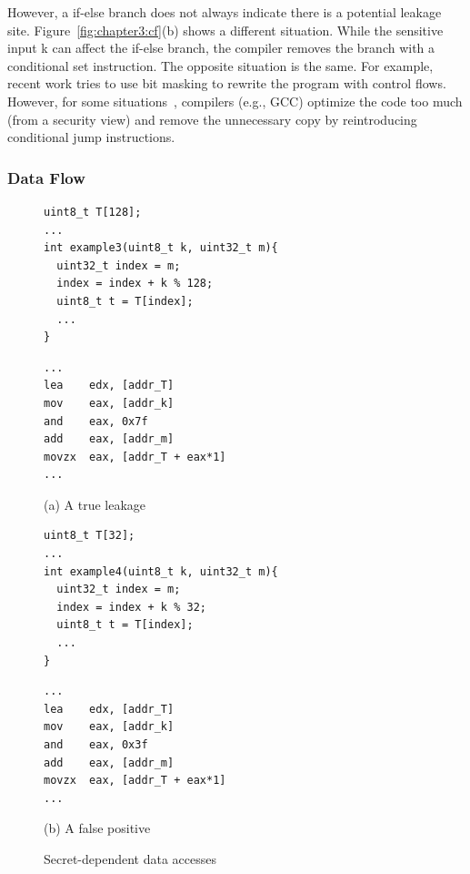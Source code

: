 However, a if-else branch does not always indicate there is a potential leakage site. Figure~\ref{fig:chapter3:cf}(b) shows a different situation. While the sensitive input \textsf{k} can affect the if-else branch, the compiler removes the branch with a conditional set instruction.  The opposite situation is the same. For example, recent work tries to use bit masking to rewrite the program with control flows. However, for some situations~\cite{Coppens:2009:PMT:1607723.1608124}, compilers (e.g., GCC) optimize the code too much (from a security view) and remove the unnecessary copy by reintroducing conditional jump instructions.
\subsubsection{Data Flow}
\begin{figure}[ht]
  \begin{minipage}{0.4\linewidth}
    \begin{lstlisting}[xleftmargin=.15\textwidth, xrightmargin=.0\textwidth, frame=none]
uint8_t T[128];
...
int example3(uint8_t k, uint32_t m){
  uint32_t index = m;
  index = index + k % 128;
  uint8_t t = T[index];
  ...
}
\end{lstlisting}
  \end{minipage}
  \hfill
  \begin{minipage}{0.4\linewidth}
    \begin{lstlisting}[xleftmargin=.15\textwidth, xrightmargin=.00\textwidth, frame=none, numbers=none, mathescape=true]
...
lea    edx, [addr_T]
mov    eax, [addr_k]
and    eax, 0x7f
add    eax, [addr_m]
movzx  eax, [addr_T + eax*1]
...
\end{lstlisting}
  \end{minipage}\caption*{(a) A true leakage}

  \begin{minipage}{0.4\linewidth}
    \begin{lstlisting}[xleftmargin=.15\textwidth, xrightmargin=.0\textwidth, frame=none]
uint8_t T[32];
...
int example4(uint8_t k, uint32_t m){
  uint32_t index = m;
  index = index + k % 32;
  uint8_t t = T[index];
  ...
}
\end{lstlisting}
  \end{minipage}
  \hfill
  \begin{minipage}{0.4\linewidth}
    \begin{lstlisting}[xleftmargin=.15\textwidth, xrightmargin=.00\textwidth, frame=none, numbers=none, mathescape=true]
...
lea    edx, [addr_T]
mov    eax, [addr_k]
and    eax, 0x3f
add    eax, [addr_m]
movzx  eax, [addr_T + eax*1]
...
\end{lstlisting}
  \end{minipage}\caption*{(b) A false positive}
  \caption{Secret-dependent data accesses}\label{fig:chapter3:da}
\end{figure}

